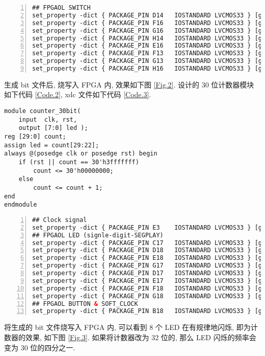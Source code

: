 \documentclass[UTF8,fontset=fandol]{ctexart}
\begin{document}
\begin{ExQuestions}
\begin{lstlisting}[basicstyle=\footnotesize\ttfamily, numbers = left, language = XML, frame=lrtb, frameround=tttt, caption={修改后的 xdc 文件}]
## FPGAOL SWITCH
set_property -dict { PACKAGE_PIN D14   IOSTANDARD LVCMOS33 } [get_ports { sw[7] }];
set_property -dict { PACKAGE_PIN F16   IOSTANDARD LVCMOS33 } [get_ports { sw[6] }];
set_property -dict { PACKAGE_PIN G16   IOSTANDARD LVCMOS33 } [get_ports { sw[5] }];
set_property -dict { PACKAGE_PIN H14   IOSTANDARD LVCMOS33 } [get_ports { sw[4] }];
set_property -dict { PACKAGE_PIN E16   IOSTANDARD LVCMOS33 } [get_ports { sw[3] }];
set_property -dict { PACKAGE_PIN F13   IOSTANDARD LVCMOS33 } [get_ports { sw[2] }];
set_property -dict { PACKAGE_PIN G13   IOSTANDARD LVCMOS33 } [get_ports { sw[1] }];
set_property -dict { PACKAGE_PIN H16   IOSTANDARD LVCMOS33 } [get_ports { sw[0] }];    
  \end{lstlisting}
  生成 bit 文件后, 烧写入 FPGA 内, 效果如下图 \ref{Fig.2}.
  \question 设计的 30 位计数器模块如下代码 \ref{Code.2}, xdc 文件如下代码 \ref{Code.3}.
  \begin{lstlisting}[style=verilogstyle, caption = {30 位计数器模块代码}, label = {Code.2}]
module counter_30bit(
    input  clk, rst,
    output [7:0] led );
reg [29:0] count;
assign led = count[29:22];
always @(posedge clk or posedge rst) begin
    if (rst || count == 30'h3fffffff)
        count <= 30'h00000000;
    else
        count <= count + 1;
end
endmodule
  \end{lstlisting}
  \begin{lstlisting}[basicstyle=\footnotesize\ttfamily, numbers = left, language = XML, frame=lrtb, frameround=tttt, caption={计数器 xdc 文件}, label = {Code.3}]
## Clock signal
set_property -dict { PACKAGE_PIN E3    IOSTANDARD LVCMOS33 } [get_ports { clk }];
## FPGAOL LED (signle-digit-SEGPLAY)
set_property -dict { PACKAGE_PIN C17   IOSTANDARD LVCMOS33 } [get_ports { led[0] }];
set_property -dict { PACKAGE_PIN D18   IOSTANDARD LVCMOS33 } [get_ports { led[1] }];
set_property -dict { PACKAGE_PIN E18   IOSTANDARD LVCMOS33 } [get_ports { led[2] }];
set_property -dict { PACKAGE_PIN G17   IOSTANDARD LVCMOS33 } [get_ports { led[3] }];
set_property -dict { PACKAGE_PIN D17   IOSTANDARD LVCMOS33 } [get_ports { led[4] }];
set_property -dict { PACKAGE_PIN E17   IOSTANDARD LVCMOS33 } [get_ports { led[5] }];
set_property -dict { PACKAGE_PIN F18   IOSTANDARD LVCMOS33 } [get_ports { led[6] }];
set_property -dict { PACKAGE_PIN G18   IOSTANDARD LVCMOS33 } [get_ports { led[7] }];
## FPGAOL BUTTON & SOFT_CLOCK
set_property -dict { PACKAGE_PIN B18   IOSTANDARD LVCMOS33 } [get_ports { rst }];
  \end{lstlisting}
  将生成的 bit 文件烧写入 FPGA 内, 可以看到 8 个 LED 在有规律地闪烁, 即为计数器的效果, 如下图 \ref{Fig.3}. 如果将计数器改为 32 位的, 那么 LED 闪烁的频率会变为 30 位的四分之一.
\end{ExQuestions} 
\end{document}
